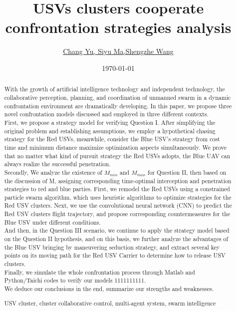 \documentclass{mcmthesis}
\title{  USVs clusters cooperate confrontation strategies analysis}
\author{\small \href{http://www.latexstudio.net/}
  {Chang Yu, \space \space \space \space \space  Siyu Ma,\space  \space  \space  \space  \space Shengzhe Wang}}
\date{\today}
\begin{document}
\begin{abstract}
With the growth of artificial intelligence technology and independent technology, the collaborative perception, planning, and coordination of unmanned swarm in a dynamic confrontation environment are dramatically developing. In this paper, we propose three novel confrontation models discussed and employed in three different contexts. \\
First, we propose a strategy model for verifying Question I. After simplifying the original problem and establishing assumptions, we employ a hypothetical chasing strategy for the Red USVs, meanwhile, consider the Blue USV's strategy from cost time and minimum distance maximize optimization aspects simultaneously. We prove that no matter what kind of pursuit strategy the Red USVs adopts, the Blue UAV can always realize the successful penetration. \\
Secondly, We analyze the existence of $M_{min}$ and $M_{max}$ for Question II, then based on the discussion of M, assigning corresponding time-optimal interception and penetration strategies to red and blue parties. First, we remodel the Red USVs using a constrained particle swarm algorithm, which uses heuristic algorithms to optimize strategies for the Red USV clusters. Next, we use the convolutional neural network (CNN) to predict the Red USV clusters flight trajectory, and propose corresponding countermeasures for the Blue USV under different conditions. \\
And then, in the Question III scenario, we continue to apply the strategy model based on the Question II hypothesis, and on this basis, we further analyze the advantages of the Blue USV bringing by maneuvering seduction strategy, and extract several key points on its moving path for the Red USV Carrier to determine how to release USV clusters. \\
Finally, we simulate the whole confrontation process through Matlab and Python/Taichi codes to verify our models 1111111111. \\
We deduce our conclusions in the end, summarize our strengths and weaknesses.
\begin{keywords}
USV cluster, cluster collaborative control, multi-agent system, swarm intelligence
\end{keywords}
\end{abstract}
\maketitle
\tableofcontents
\newpage
\end{document}
